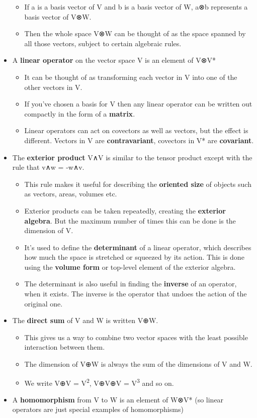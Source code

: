 \documentclass[oneside,english]{amsbook}
\numberwithin{section}{chapter}
\theoremstyle{plain}
\theoremstyle{definition}
\begin{document}
\begin{itemize}
	\begin{itemize}
		\item
		If a is a basis vector of V and b is a basis vector of W, a⊗b
		represents a basis vector of V⊗W.
		\item
		Then the whole space V⊗W can be thought of as the space spanned by
		all those vectors, subject to certain algebraic rules.
	\end{itemize}
	\item
	A \textbf{linear operator} on the vector space V is an element of V⊗V*
	
	\begin{itemize}
		\item
		It can be thought of as transforming each vector in V into one of
		the other vectors in V.
		\item
		If you've chosen a basis for V then any linear operator can be
		written out compactly in the form of a \textbf{matrix}.
		\item
		Linear operators can act on covectors as well as vectors, but the
		effect is different. Vectors in V are \textbf{contravariant},
		covectors in V* are \textbf{covariant}.
	\end{itemize}
	\item
	The \textbf{exterior product} V∧V is similar to the tensor product
	except with the rule that v∧w = -w∧v.
	
	\begin{itemize}
		\item
		This rule makes it useful for describing the \textbf{oriented size}
		of objects such as vectors, areas, volumes etc.
		\item
		Exterior products can be taken repeatedly, creating the
		\textbf{exterior algebra}. But the maximum number of times this can
		be done is the dimension of V.
		\item
		It's used to define the \textbf{determinant} of a linear operator,
		which describes how much the space is stretched or squeezed by its
		action. This is done using the \textbf{volume form} or top-level
		element of the exterior algebra.
		\item
		The determinant is also useful in finding the \textbf{inverse} of an
		operator, when it exists. The inverse is the operator that undoes
		the action of the original one.
	\end{itemize}
	\item
	The \textbf{direct sum} of V and W is written V⊕W.
	
	\begin{itemize}
		\item
		This gives us a way to combine two vector spaces with the least
		possible interaction between them.
		\item
		The dimension of V⊕W is always the sum of the dimensions of V and W.
		\item
		We write V⊕V = V\textsuperscript{2}, V⊕V⊕V = V\textsuperscript{3}
		and so on.
	\end{itemize}
	\item
	A \textbf{homomorphism} from V to W is an element of W⊗V* (so linear
	operators are just special examples of homomorphisms)
	

\end{itemize}
\end{document}
